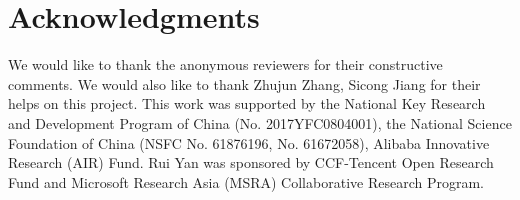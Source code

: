 \documentclass[letterpaper]{article} \usepackage{aaai19}  \usepackage{times}  \usepackage{helvet}  \usepackage{courier}
\begin{document}
\section{Acknowledgments}
We would like to thank the anonymous reviewers for their constructive comments. 
We would also like to thank Zhujun Zhang, Sicong Jiang for their helps on this project. 
This work was supported by the National Key Research and Development Program of China (No. 2017YFC0804001), the National Science Foundation of China (NSFC No. 61876196, No. 61672058), Alibaba Innovative Research (AIR) Fund. 
Rui Yan was sponsored by CCF-Tencent Open Research Fund and Microsoft Research Asia (MSRA) Collaborative Research Program.



\end{document}
